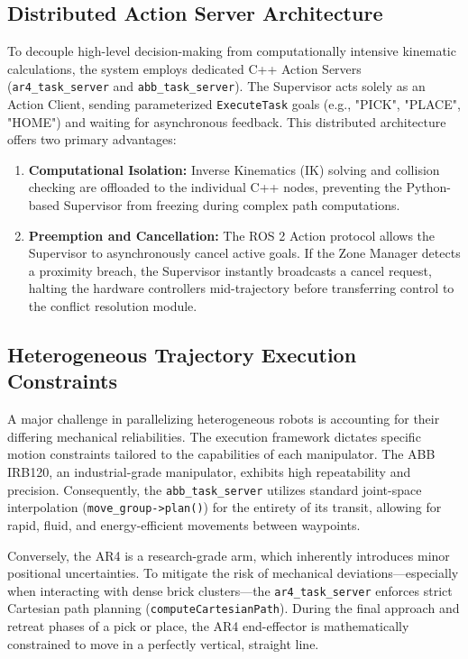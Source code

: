 \subsection{Distributed Action Server Architecture}
To decouple high-level decision-making from computationally intensive kinematic calculations, the system employs dedicated C++ Action Servers (\texttt{ar4\_task\_server} and \texttt{abb\_task\_server}). The Supervisor acts solely as an Action Client, sending parameterized \texttt{ExecuteTask} goals (e.g., "PICK", "PLACE", "HOME") and waiting for asynchronous feedback. This distributed architecture offers two primary advantages:
\begin{enumerate}
    \item \textbf{Computational Isolation:} Inverse Kinematics (IK) solving and collision checking are offloaded to the individual C++ nodes, preventing the Python-based Supervisor from freezing during complex path computations.
    \item \textbf{Preemption and Cancellation:} The ROS 2 Action protocol allows the Supervisor to asynchronously cancel active goals. If the Zone Manager detects a proximity breach, the Supervisor instantly broadcasts a cancel request, halting the hardware controllers mid-trajectory before transferring control to the conflict resolution module.
\end{enumerate}

\subsection{Heterogeneous Trajectory Execution Constraints}
A major challenge in parallelizing heterogeneous robots is accounting for their differing mechanical reliabilities. The execution framework dictates specific motion constraints tailored to the capabilities of each manipulator. The ABB IRB120, an industrial-grade manipulator, exhibits high repeatability and precision. Consequently, the \texttt{abb\_task\_server} utilizes standard joint-space interpolation (\texttt{move\_group->plan()}) for the entirety of its transit, allowing for rapid, fluid, and energy-efficient movements between waypoints.

Conversely, the AR4 is a research-grade arm, which inherently introduces minor positional uncertainties. To mitigate the risk of mechanical deviations—especially when interacting with dense brick clusters—the \texttt{ar4\_task\_server} enforces strict Cartesian path planning (\texttt{computeCartesianPath}). During the final approach and retreat phases of a pick or place, the AR4 end-effector is mathematically constrained to move in a perfectly vertical, straight line. 

